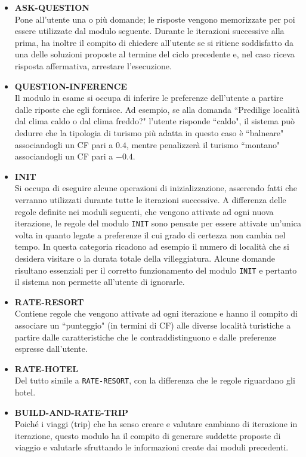 \begin{itemize}
\item \textbf{ASK-QUESTION}\\
Pone all'utente una o più domande; le risposte vengono memorizzate per poi essere utilizzate dal modulo seguente.  Durante le iterazioni successive alla prima, ha inoltre il compito di chiedere all'utente se si ritiene soddisfatto da una delle soluzioni proposte al termine del ciclo precedente e, nel caso riceva risposta affermativa, arrestare l'esecuzione.
\item \textbf{QUESTION-INFERENCE}\\
Il modulo in esame si occupa di inferire le preferenze dell'utente a partire dalle riposte che egli fornisce. Ad esempio, se alla domanda ``Predilige località dal clima caldo o dal clima freddo?" l'utente risponde ``caldo", il sistema può dedurre che la tipologia di turismo più adatta in questo caso è ``balneare" associandogli un CF pari a $0.4$, mentre penalizzerà il turismo ``montano" associandogli un CF pari a $-0.4$.
\item \textbf{INIT}\\
Si occupa di eseguire alcune operazioni di inizializzazione, asserendo fatti che verranno utilizzati durante tutte le iterazioni successive. A differenza delle regole definite nei moduli seguenti, che vengono attivate ad ogni nuova iterazione, le regole del modulo \texttt{INIT} sono pensate per essere attivate un'unica volta in quanto legate a preferenze il cui grado di certezza non cambia nel tempo. In questa categoria ricadono ad esempio il numero di località che si desidera visitare o la durata totale della villeggiatura. Alcune domande risultano essenziali per il corretto funzionamento del modulo \texttt{INIT} e pertanto il sistema non permette all'utente di ignorarle. 
\item \textbf{RATE-RESORT}\\
Contiene regole che vengono attivate ad ogni iterazione e hanno il compito di associare un ``punteggio" (in termini di CF) alle diverse località turistiche a partire dalle caratteristiche che le contraddistinguono e dalle preferenze espresse dall'utente.
\item \textbf{RATE-HOTEL}\\
Del tutto simile a \texttt{RATE-RESORT}, con la differenza che le regole riguardano gli hotel.
\item \textbf{BUILD-AND-RATE-TRIP}\\
Poiché i viaggi (trip) che ha senso creare e valutare cambiano di iterazione in iterazione, questo modulo ha il compito di generare suddette proposte di viaggio e valutarle sfruttando le informazioni create dai moduli precedenti. 

\end{itemize}
